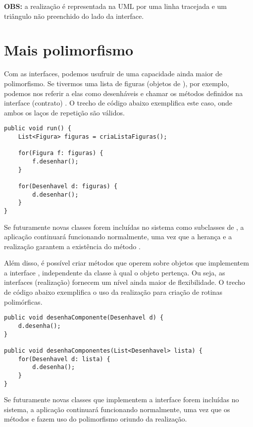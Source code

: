 \textbf{OBS:} a realização é representada na UML por uma linha tracejada e um triângulo não preenchido do lado da interface.

\section{Mais polimorfismo}

Com as interfaces, podemos usufruir de uma capacidade ainda maior de polimorfismo. Se tivermos uma lista de figuras (objetos de ), por exemplo, podemos nos referir a elas como desenháveis e chamar os métodos definidos na interface (contrato) . O trecho de código abaixo exemplifica este caso, onde ambos os laços de repetição são válidos.

\begin{verbatim}
public void run() {
	List<Figura> figuras = criaListaFiguras();
	
	for(Figura f: figuras) {
		f.desenhar();
	}
	
	for(Desenhavel d: figuras) {
		d.desenhar();
	}
}
\end{verbatim}

Se futuramente novas classes forem incluídas no sistema como subclasses de , a aplicação continuará funcionando normalmente, uma vez que a herança e a realização garantem a existência do método .

Além disso, é possível criar métodos que operem sobre objetos que implementem a interface , independente da classe à qual o objeto pertença. Ou seja, as interfaces (realização) fornecem um nível ainda maior de flexibilidade. O trecho de código abaixo exemplifica o uso da realização para criação de rotinas polimórficas.

\begin{verbatim}
public void desenhaComponente(Desenhavel d) {
	d.desenha();
}

public void desenhaComponentes(List<Desenhavel> lista) {
	for(Desenhavel d: lista) {
		d.desenha();
	}
}
\end{verbatim}

Se futuramente novas classes que implementem a interface  forem incluídas no sistema, a aplicação continuará funcionando normalmente, uma vez que os métodos  e  fazem uso do polimorfismo oriundo da realização.